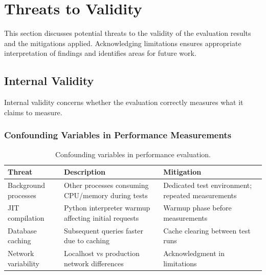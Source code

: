 
\section{Threats to Validity}
\label{sec:threats-validity}

This section discusses potential threats to the validity of the evaluation results and the mitigations applied. Acknowledging limitations ensures appropriate interpretation of findings and identifies areas for future work.

\subsection{Internal Validity}

Internal validity concerns whether the evaluation correctly measures what it claims to measure.

\subsubsection{Confounding Variables in Performance Measurements}

\begin{table}[ht]
\centering
\caption{Confounding variables in performance evaluation.}
\label{tab:confounding-perf}
\small
\begin{tabular}{p{4cm}p{5.5cm}p{3.5cm}}
\hline
\textbf{Threat} & \textbf{Description} & \textbf{Mitigation} \\
\hline
Background processes & Other processes consuming CPU/memory during tests & Dedicated test environment; repeated measurements \\
JIT compilation & Python interpreter warmup affecting initial requests & Warmup phase before measurements \\
Database caching & Subsequent queries faster due to caching & Cache clearing between test runs \\
Network variability & Localhost vs production network differences & Acknowledgment in limitations \\
\hline
\end{tabular}
\end{table}


